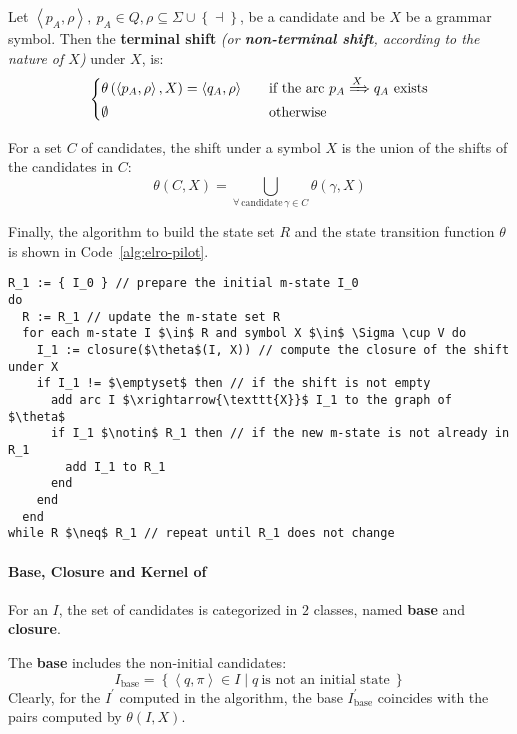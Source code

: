 \documentclass[english]{article}
\begin{document}
Let \(\left\langle p_A, \rho \right\rangle, \ p_A \in Q, \rho \subseteq \Sigma \cup \left\{ \dashv \right\}\), be a candidate and be \(X\) be a grammar symbol.
Then the \textbf{terminal shift} \textit{(or \textbf{non-terminal shift}, according to the nature of \(X\))} under \(X\), is:
\[\begin{cases}
    \theta \left( \left\langle p_A, \rho \right\rangle, X \right) = \left\langle q_A, \rho \right\rangle \quad & \text{if the arc} \ p_A \xRightarrow{X} q_A \ \text{exists} \\
    \emptyset \quad                                                                                            & \text{otherwise}
  \end{cases}\]

For a set \(C\) of candidates, the shift under a symbol \(X\) is the union of the shifts of the candidates in \(C\):
\[ \theta(C, X) = \bigcup_{\forall \, \text{candidate} \, \gamma \in C} \theta(\gamma, X) \]

Finally, the algorithm to build the state set \(R\) and the state transition function \(\theta\) is shown in Code~\ref{alg:elro-pilot}.

\begin{lstlisting}[caption={Algorithm to build the \elro pilot automaton}, label={alg:elro-pilot}]
R_1 := { I_0 } // prepare the initial m-state I_0
do
  R := R_1 // update the m-state set R
  for each m-state I $\in$ R and symbol X $\in$ \Sigma \cup V do
    I_1 := closure($\theta$(I, X)) // compute the closure of the shift under X
    if I_1 != $\emptyset$ then // if the shift is not empty
      add arc I $\xrightarrow{\texttt{X}}$ I_1 to the graph of $\theta$
      if I_1 $\notin$ R_1 then // if the new m-state is not already in R_1
        add I_1 to R_1
      end
    end
  end
while R $\neq$ R_1 // repeat until R_1 does not change
\end{lstlisting}

\paragraph[Base, Closure and Kernel of m-state]{Base, Closure and Kernel of \mstate}
\label{par:base-closure-kernel}

For an \mstate \(I\), the set of candidates is categorized in \(2\) classes, named \textbf{base} and \textbf{closure}.

The \textbf{base} includes the non-initial candidates:
\[ I_{\text{base}} = \left\{ \left\langle q, \pi \right\rangle \in I \mid q \ \text{is not an initial state} \ \right\} \]
Clearly, for the \mstate \(I^\prime\) computed in the algorithm, the base \(I^\prime_{\text{base}}\) coincides with the pairs computed by \(\theta(I, X)\).
\end{document}
